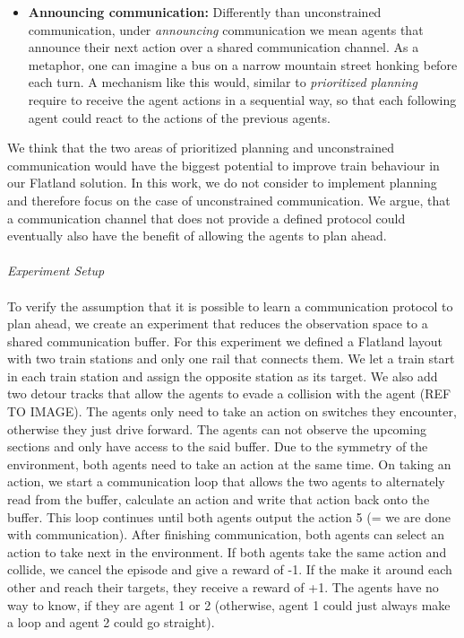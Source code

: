 \begin{itemize}
	\item \textbf{Announcing communication:} Differently than unconstrained communication, under \textit{announcing} communication we mean agents that announce their next action over a shared communication channel. As a metaphor, one can imagine a bus on a narrow mountain street honking before each turn. A mechanism like this would, similar to \textit{prioritized planning} require to receive the agent actions in a sequential way, so that each following agent could react to the actions of the previous agents.
\end{itemize}

We think that the two areas of prioritized planning and unconstrained communication would have the biggest potential to improve train behaviour in our Flatland solution. In this work, we do not consider to implement planning and therefore focus on the case of unconstrained communication. We argue, that a communication channel that does not provide a defined protocol could eventually also have the benefit of allowing the agents to plan ahead.\\\\
\textit{Experiment Setup}\\\\
To verify the assumption that it is possible to learn a communication protocol to plan ahead, we create an experiment that reduces the observation space to a shared communication buffer. For this experiment we defined a Flatland layout with two train stations and only one rail that connects them. We let a train start in each train station and assign the opposite station as its target. We also add two detour tracks that allow the agents to evade a collision with the agent (REF TO IMAGE).
The agents only need to take an action on switches they encounter, otherwise they just drive forward. The agents can not observe the upcoming sections and only have access to the said buffer. Due to the symmetry of the environment, both agents need to take an action at the same time. On taking an action, we start a communication loop that allows the two agents to alternately read from the buffer, calculate an action and write that action back onto the buffer. This loop continues until both agents output the action 5 (= we are done with communication). After finishing communication, both agents can select an action to take next in the environment. If both agents take the same action and collide, we cancel the episode and give a reward of -1. If the make it around each other and reach their targets, they receive a reward of +1. The agents have no way to know, if they are agent 1 or 2 (otherwise, agent 1 could just always make a loop and agent 2 could go straight).







